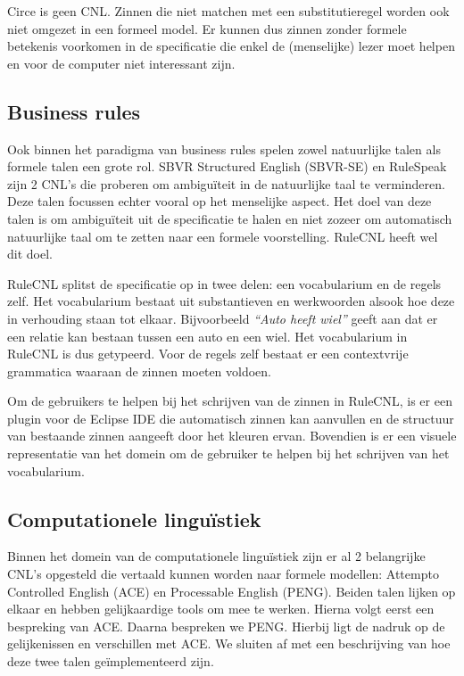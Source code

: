 \documentclass[]{article}
\theoremstyle{definition}
\newcommand{\example}[1]{\textit{``#1''}}
\begin{document}
Circe is geen CNL. Zinnen die niet matchen met een substitutieregel worden ook niet omgezet in een formeel model. Er kunnen dus zinnen zonder formele betekenis voorkomen in de specificatie die enkel de (menselijke) lezer moet helpen en voor de computer niet interessant zijn.

\subsection{Business rules}
Ook binnen het paradigma van business rules spelen zowel natuurlijke talen als formele talen een grote rol. SBVR Structured English (SBVR-SE) \cite{Levy2013} en RuleSpeak \cite{Ross2009a} zijn 2 CNL's die proberen om ambiguïteit in de natuurlijke taal te verminderen. Deze talen focussen echter vooral op het menselijke aspect. Het doel van deze talen is om ambiguïteit uit de specificatie te halen en niet zozeer om automatisch natuurlijke taal om te zetten naar een formele voorstelling. RuleCNL \cite{Njonko2014} heeft wel dit doel.

RuleCNL splitst de specificatie op in twee delen: een vocabularium en de regels zelf. Het vocabularium bestaat uit substantieven en werkwoorden alsook hoe deze in verhouding staan tot elkaar. Bijvoorbeeld \example{Auto heeft wiel} geeft aan dat er een relatie kan bestaan tussen een auto en een wiel. Het vocabularium in RuleCNL is dus getypeerd. Voor de regels zelf bestaat er een contextvrije grammatica waaraan de zinnen moeten voldoen.

Om de gebruikers te helpen bij het schrijven van de zinnen in RuleCNL, is er een plugin voor de Eclipse IDE die automatisch zinnen kan aanvullen en de structuur van bestaande zinnen aangeeft door het kleuren ervan. Bovendien is er een visuele representatie van het domein om de gebruiker te helpen bij het schrijven van het vocabularium.

\subsection{Computationele linguïstiek} Binnen het domein van de computationele linguïstiek zijn er al 2 belangrijke CNL's opgesteld die vertaald kunnen worden naar formele modellen: Attempto Controlled English (ACE) en Processable English (PENG). Beiden talen lijken op elkaar en hebben gelijkaardige tools om mee te werken. Hierna volgt eerst een bespreking van ACE. Daarna bespreken we PENG. Hierbij ligt de nadruk op de gelijkenissen en verschillen met ACE. We sluiten af met een beschrijving van hoe deze twee talen geïmplementeerd zijn.
\end{document}
